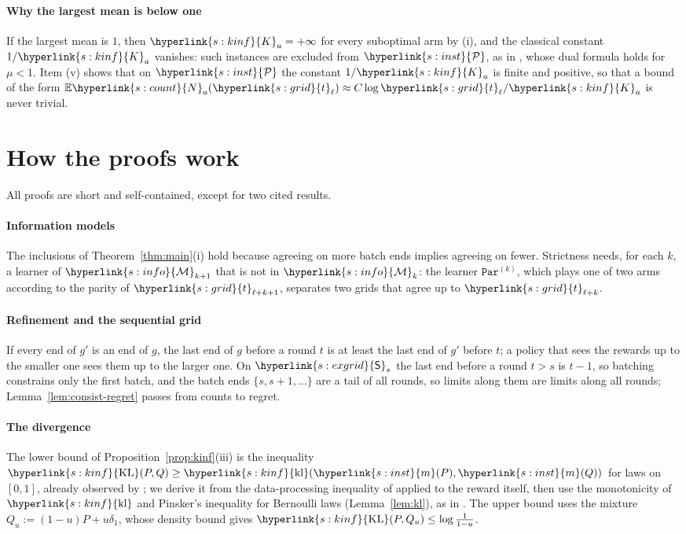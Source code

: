 \documentclass[11pt]{article}
\newcommand{\sy}[2]{{\hyperlink{#1}{#2}}}
\newcommand{\E}{\mathbb{E}}
\newcommand{\1}{\mathbf{1}}
\newcommand{\mean}{\sy{s:inst}{m}}
\newcommand{\cP}{\sy{s:inst}{\mathcal P}}
\newcommand{\KL}{\sy{s:kinf}{\mathrm{KL}}}
\newcommand{\kl}{\sy{s:kinf}{\mathrm{kl}}}
\newcommand{\Ka}{\sy{s:kinf}{K}}
\newcommand{\Ng}{\sy{s:count}{N}}
\newcommand{\tl}{\sy{s:grid}{t}}
\newcommand{\Sq}{\sy{s:exgrid}{\mathsf S}}
\newcommand{\Mk}[1]{\sy{s:info}{\mathcal M}_{#1}}
\newcommand{\Par}{\hyperref[def:exlearners]{\texttt{Par}}}
\begin{document}
\paragraph{Why the largest mean is below one} If the largest mean is $1$, then $\Ka_a=+\infty$ for every suboptimal arm by
(i), and the classical constant $1/\Ka_a$ vanishes: such instances are excluded from $\cP$, as in
\citet[Theorem~8]{HT10}, whose dual formula holds for $\mu<1$. Item (v) shows that on $\cP$ the
constant $1/\Ka_a$ is finite and positive, so that a bound of the form $\E\Ng_a(\tl_\ell)\approx
C\log\tl_\ell/\Ka_a$ is never trivial.

\section{How the proofs work}\label{sec:overview}

All proofs are short and self-contained, except for two cited results.

\paragraph{Information models} The inclusions of Theorem~\ref{thm:main}(i) hold because agreeing
on more batch ends implies agreeing on fewer. Strictness needs, for each $k$, a learner of
$\Mk{k+1}$ that is not in $\Mk{k}$: the learner $\Par^{(k)}$, which plays one of two arms according
to the parity of $\tl_{\ell+k+1}$, separates two grids that agree up to $\tl_{\ell+k}$.

\paragraph{Refinement and the sequential grid} If every end of $g'$ is an end of $g$, the last end of
$g$ before a round $t$ is at least the last end of $g'$ before $t$; a policy that sees the rewards
up to the smaller one sees them up to the larger one. On $\Sq_s$ the last end before a round $t>s$
is $t-1$, so batching constrains only the first batch, and the batch ends $\{s,s+1,\dots\}$ are a
tail of all rounds, so limits along them are limits along all rounds; Lemma~\ref{lem:consist-regret}
passes from counts to regret.

\paragraph{The divergence} The lower bound of Proposition~\ref{prop:kinf}(iii) is the inequality
$\KL(P,Q)\ge\kl(\mean(P),\mean(Q))$ for laws on $[0,1]$, already observed by
\citet[Section~6.1]{CGMMS13}; we derive it from the data-processing inequality of
\citet[Lemma~1]{GMS19} applied to the reward itself, then use the monotonicity of $\kl$ and
Pinsker's inequality for Bernoulli laws (Lemma~\ref{lem:kl}), as in \citet[(7)]{GHMS22}. The upper
bound uses the mixture $Q_u:=(1-u)P+u\delta_1$, whose density bound gives
$\KL(P,Q_u)\le\log\frac1{1-u}$.
\end{document}
